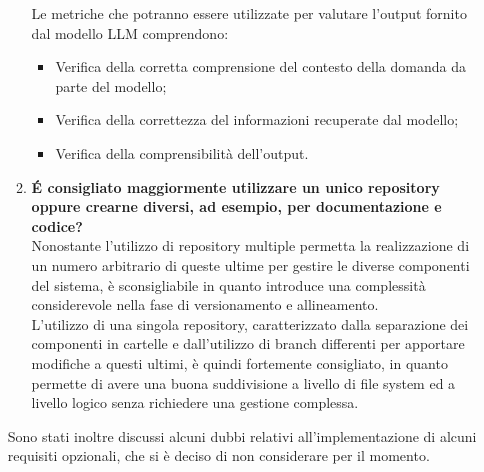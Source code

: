 \begin{enumerate}
\begin{enumerate}[label=\Alph*)]
        Le metriche che potranno essere utilizzate per valutare l'output fornito dal modello LLM comprendono:
        \begin{itemize}
            \item Verifica della corretta comprensione del contesto della domanda da parte del modello;
            \item Verifica della correttezza del informazioni recuperate dal modello;
            \item Verifica della comprensibilità dell'output.
        \end{itemize}
        \item \textbf{\'E consigliato maggiormente utilizzare un unico repository oppure crearne diversi, ad esempio, per documentazione e codice?}\\
        Nonostante l'utilizzo di repository multiple permetta la realizzazione di un numero arbitrario di queste ultime per gestire le diverse componenti del sistema, è sconsigliabile in quanto introduce una complessità considerevole nella fase di versionamento e allineamento.\\
        L'utilizzo di una singola repository, caratterizzato dalla separazione dei componenti in cartelle e dall'utilizzo di branch differenti per apportare modifiche a questi ultimi, è quindi fortemente consigliato, in quanto permette di avere una buona suddivisione a livello di file system ed a livello logico senza richiedere una gestione complessa.
    \end{enumerate}
    Sono stati inoltre discussi alcuni dubbi relativi all'implementazione di alcuni requisiti opzionali, che si è deciso di non considerare per il momento.
\end{enumerate}